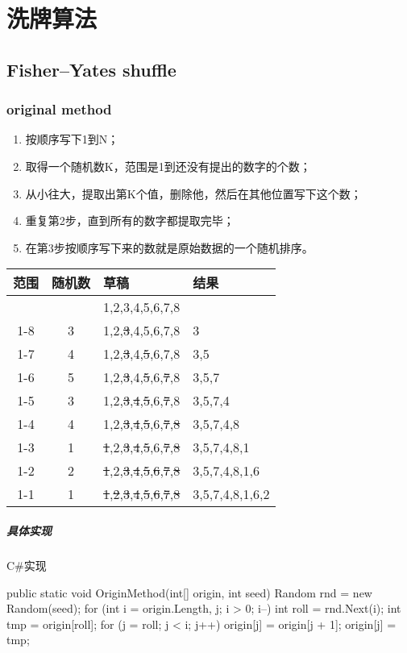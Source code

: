 \chapter{洗牌算法}

\section{Fisher–Yates shuffle}
\subsection{original method}
\begin{enumerate}
\item 按顺序写下1到N；
\item 取得一个随机数K，范围是1到还没有提出的数字的个数；
\item 从小往大，提取出第K个值，删除他，然后在其他位置写下这个数；
\item 重复第2步，直到所有的数字都提取完毕；
\item 在第3步按顺序写下来的数就是原始数据的一个随机排序。
\end{enumerate}

\begin{tabular}{|c|c|l|l|}
	\hline
	范围 & 随机数 & 草稿 & 结果\\
	\hline
	 & &1,2,3,4,5,6,7,8& \\
	\hline
	1-8 & 3 & 1,2,\sout{3},4,5,6,7,8 & 3\\
	\hline
	1-7 & 4 & 1,2,\sout{3},4,\sout{5},6,7,8 & 3,5\\
	\hline
	1-6 & 5 & 1,2,\sout{3},4,\sout{5},6,\sout{7},8 & 3,5,7\\
	\hline
	1-5 & 3 & 1,2,\sout{3},\sout{4},\sout{5},6,\sout{7},8 & 3,5,7,4\\
	\hline
	1-4 & 4 & 1,2,\sout{3},\sout{4},\sout{5},6,\sout{7},\sout{8} & 3,5,7,4,8\\
	\hline
	1-3 & 1 & \sout{1},2,\sout{3},\sout{4},\sout{5},6,\sout{7},\sout{8} & 3,5,7,4,8,1\\
	\hline
	1-2 & 2 & \sout{1},2,\sout{3},\sout{4},\sout{5},\sout{6},\sout{7},\sout{8} & 3,5,7,4,8,1,6\\
	\hline
	1-1 & 1 & \sout{1},\sout{2},\sout{3},\sout{4},\sout{5},\sout{6},\sout{7},\sout{8} & 3,5,7,4,8,1,6,2\\
	\hline
\end{tabular}
\paragraph{具体实现} C\#实现
\begin{CSharp}
        public static void OriginMethod(int[] origin, int seed)
        {
            Random rnd = new Random(seed);
            for (int i = origin.Length, j; i > 0; i--)
            {
                int roll = rnd.Next(i);
                int tmp = origin[roll];
                for (j = roll; j < i; j++)
                {
                    origin[j] = origin[j + 1];
                }
                origin[j] = tmp;
            }
        }
\end{CSharp}


